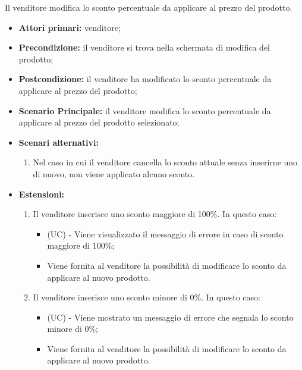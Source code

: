 Il venditore modifica lo sconto percentuale da applicare al prezzo del prodotto.
\begin{itemize}
    \item \textbf{Attori primari:} venditore;
    \item \textbf{Precondizione:} il venditore si trova nella schermata di modifica del prodotto;
    \item \textbf{Postcondizione:} il venditore ha modificato lo sconto percentuale da applicare al prezzo del prodotto;
    \item \textbf{Scenario Principale:} il venditore modifica lo sconto percentuale da applicare al prezzo del prodotto selezionato;
    \item \textbf{Scenari alternativi:}
    \begin{enumerate}[label=\lett]
    	\item Nel caso in cui il venditore cancella lo sconto attuale senza inserirne uno di nuovo, non viene applicato alcuno sconto.
    \end{enumerate}
    \item \textbf{Estensioni:}
    \begin{enumerate}[label=\lett]
    	\item Il venditore inserisce uno sconto maggiore di 100\%. In questo caso:
		\begin{itemize}
			\item (UC) - Viene visualizzato il messaggio di errore in caso di sconto maggiore di 100\%;
			\item Viene fornita al venditore la possibilità di modificare lo sconto da applicare al nuovo prodotto.
		\end{itemize}
		\item Il venditore inserisce uno sconto minore di 0\%. In questo caso:
		\begin{itemize}
			\item (UC) - Viene mostrato un messaggio di errore che segnala lo sconto minore di 0\%;
			\item Viene fornita al venditore la possibilità di modificare lo sconto da applicare al nuovo prodotto.
		\end{itemize}
    \end{enumerate}
\end{itemize}


